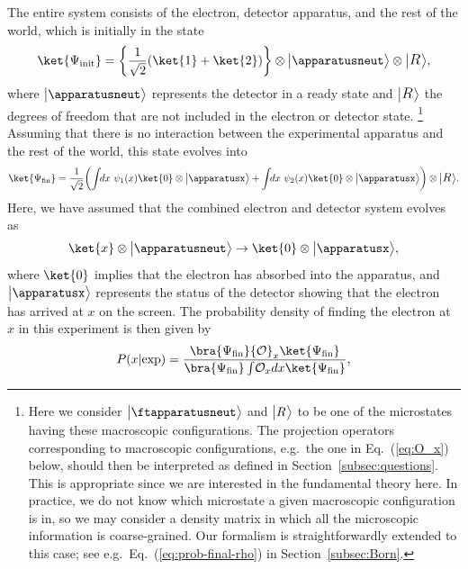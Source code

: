 \documentclass[12pt]{article}
\begin{document}
The entire system consists of the electron, detector apparatus, and the 
rest of the world, which is initially in the state
%
\begin{equation}
  \ket{\Psi_{\rm init}} = 
    \biggl\{ \frac{1}{\sqrt{2}} (\ket{1} + \ket{2}) \biggr\}
    \otimes \bigl|\apparatusneut\bigr> 
    \otimes \bigl|\mbox{\large $R_{}$}\bigr>,
\label{eq:exp-init}
\end{equation}
%
where $\bigl|\apparatusneut\bigr>$ represents the detector in a ready 
state and $\bigl|\mbox{\large $R_{}$}\bigr>$ the degrees of freedom that 
are not included in the electron or detector state.%
\footnote{Here we consider $\bigl|\ftapparatusneut\bigr>$ and 
 $\bigl|\mbox{\normalsize $R_{}$}\bigr>$ to be one of the microstates 
 having these macroscopic configurations.  The projection operators 
 corresponding to macroscopic configurations, e.g.\ the one in 
 Eq.~(\ref{eq:O_x}) below, should then be interpreted as defined in 
 Section~\ref{subsec:questions}.  This is appropriate since we are 
 interested in the fundamental theory here.  In practice, we do not 
 know which microstate a given macroscopic configuration is in, so we 
 may consider a density matrix in which all the microscopic information 
 is coarse-grained.  Our formalism is straightforwardly extended 
 to this case; see e.g.\ Eq.~(\ref{eq:prob-final-rho}) in 
 Section~\ref{subsec:Born}.}
Assuming that there is no interaction between the experimental apparatus 
and the rest of the world, this state evolves into
%
\begin{equation}
  \ket{\Psi_{\rm fin}} = \frac{1}{\sqrt{2}} 
    \biggl( \int\!\!dx\,\,\psi_1(x) \ket{0} \otimes \bigl|\apparatusx\bigr> 
      + \int\!\!dx\,\,\psi_2(x) \ket{0} \otimes \bigl|\apparatusx\bigr> 
    \biggr) \otimes \bigl|\mbox{\large $R_{}$}\bigr>.
\label{eq:exp-fin}
\end{equation}
%
Here, we have assumed that the combined electron and detector system 
evolves as
%
\begin{equation}
  \ket{x} \otimes \bigl|\apparatusneut\bigr> \rightarrow 
    \ket{0} \otimes \bigl|\apparatusx\bigr>,
\label{eq:absord-e}
\end{equation}
%
where $\ket{0}$ implies that the electron has absorbed into the apparatus, 
and $\bigl|\apparatusx\bigr>$ represents the status of the detector showing 
that the electron has arrived at $x$ on the screen.  The probability density 
of finding the electron at $x$ in this experiment is then given by
%
\begin{equation}
  P(x|{\rm exp}) = \frac{\bra{\Psi_{\rm fin}} {\cal O}_x \ket{\Psi_{\rm fin}}}
    {\bra{\Psi_{\rm fin}} \int\! {\cal O}_x dx \ket{\Psi_{\rm fin}}},
\label{eq:DS-prob}
\end{equation}
\end{document}
